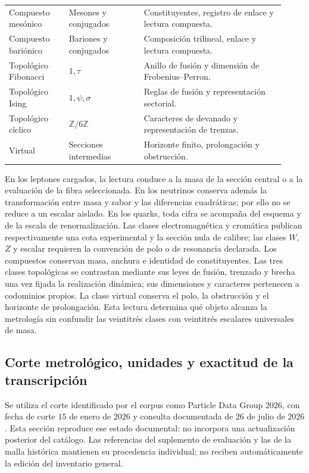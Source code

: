 \begin{longtable}{p{0.20\linewidth}p{0.25\linewidth}p{0.47\linewidth}}
Compuesto mesónico & Mesones y conjugados & Constituyentes, registro de enlace y lectura compuesta.\\
Compuesto bariónico & Bariones y conjugados & Composición trilineal, enlace y lectura compuesta.\\
Topológico Fibonacci & \(1,\tau\) & Anillo de fusión y dimensión de Frobenius--Perron.\\
Topológico Ising & \(1,\psi,\sigma\) & Reglas de fusión y representación sectorial.\\
Topológico cíclico & \(\mathbb Z/6\mathbb Z\) & Caracteres de devanado y representación de trenzas.\\
Virtual & Secciones intermedias & Horizonte finito, prolongación y obstrucción.\\
\end{longtable}
\endgroup

En los leptones cargados, la lectura conduce a la masa de la sección central
o a la evaluación de la fibra seleccionada. En los neutrinos conserva además
la transformación entre masa y sabor y las diferencias cuadráticas; por ello
no se reduce a un escalar aislado. En los quarks, toda cifra se acompaña del
esquema y de la escala de renormalización. Las clases electromagnética y
cromática publican respectivamente una cota experimental y la sección nula
de calibre; las clases \(W\), \(Z\) y escalar requieren la convención de polo
o de resonancia declarada. Los compuestos conservan masa, anchura e identidad
de constituyentes. Las tres clases topológicas se contrastan mediante sus
leyes de fusión, trenzado y brecha una vez fijada la realización dinámica;
sus dimensiones y caracteres pertenecen a codominios propios. La clase
virtual conserva el polo, la obstrucción y el horizonte de prolongación. Esta
lectura determina qué objeto alcanza la metrología sin confundir las
veintitrés clases con veintitrés escalares universales de masa.

\subsection{Corte metrológico, unidades y exactitud de la transcripción}
\label{subsec:vi-corte-metrologico}

Se utiliza el corte identificado por el corpus como Particle Data Group
2026, con fecha de corte \(15\) de enero de \(2026\) y consulta
documentada de \(26\) de julio de \(2026\). Esta sección reproduce ese
estado documental: no incorpora una actualización posterior del catálogo.
Las referencias del suplemento de evaluación y las de la malla histórica
mantienen su procedencia individual; no reciben automáticamente la edición
del inventario general.

